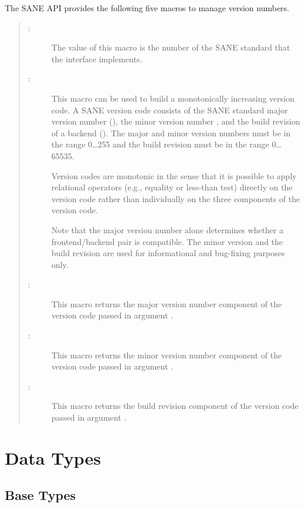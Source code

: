 \documentclass[11pt,DVIps]{report}
\begin{document}
The SANE API provides the following five macros to manage version
numbers.
\begin{quote}
  \begin{description}
  \item[:] The value of this macro is the
    number of the SANE standard that the interface implements.

  \item[:]
    \label{sec:saneversioncode}
    This macro can be used to build a monotonically increasing version
    code.  A SANE version code consists of the SANE standard major
    version number (), the minor version number ,
    and the build revision of a backend ().  The major and
    minor version numbers must be in the range 0\ldots255 and the
    build revision must be in the range 0\ldots65535.

    Version codes are monotonic in the sense that it is possible to
    apply relational operators (e.g., equality or less-than test)
    directly on the version code rather than individually on the three
    components of the version code.

    Note that the major version number alone determines whether a
    frontend/backend pair is compatible.  The minor version and the
    build revision are used for informational and bug-fixing purposes
    only.
  
  \item[:] This macro returns the
    major version number component of the version code passed in
    argument .
  \item[:] This macro returns the
    minor version number component of the version code passed in
    argument .
  \item[:] This macro returns the
    build revision component of the version code passed in argument
    .
  \end{description}
\end{quote}


\section{Data Types}

\subsection{Base Types}
\end{document}
